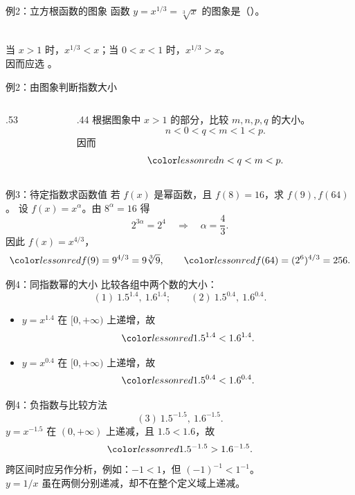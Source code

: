 \begin{frame}[t]{例2：立方根函数的图象}
 函数 $y=x^{1/3}=\sqrt[3]x$ 的图象是（\quad）。
 \par\rootchoices
 \pause
 \\
 当 $x>1$ 时，$x^{1/3}<x$；当 $0<x<1$ 时，$x^{1/3}>x$。\\
 因而应选 。
\end{frame}

\begin{frame}[t]{例2：由图象判断指数大小}
 \begin{columns}[T,onlytextwidth]
  \begin{column}{.53\textwidth}\centering\powerorder\end{column}
  \begin{column}{.44\textwidth}
   根据图象中 $x>1$ 的部分，比较 $m,n,p,q$ 的大小。
   \pause
   \[n<0<q<m<1<p.\]
   因而
   \[\ans{n<q<m<p}.\]
  \end{column}
 \end{columns}
\end{frame}

\begin{frame}[t]{例3：待定指数求函数值}
 若 $f(x)$ 是幂函数，且 $f(8)=16$，求 $f(9),f(64)$。
 \pause
 设 $f(x)=x^\alpha$。由 $8^\alpha=16$ 得
 \[2^{3\alpha}=2^4\quad\Longrightarrow\quad\alpha=\frac43.\]
 因此 $f(x)=x^{4/3}$，
 \[\ans{f(9)=9^{4/3}=9\sqrt[3]9},\qquad
   \ans{f(64)=(2^6)^{4/3}=256}.\]
\end{frame}

\begin{frame}[t]{例4：同指数幂的大小}
 比较各组中两个数的大小：
 \[(1)\ 1.5^{1.4},\ 1.6^{1.4};\qquad
   (2)\ 1.5^{0.4},\ 1.6^{0.4}.\]
 \pause
 \begin{itemize}
  \item $y=x^{1.4}$ 在 $[0,+\infty)$ 上递增，故
   \[\ans{1.5^{1.4}<1.6^{1.4}}.\]
  \item $y=x^{0.4}$ 在 $[0,+\infty)$ 上递增，故
   \[\ans{1.5^{0.4}<1.6^{0.4}}.\]
 \end{itemize}
\end{frame}

\begin{frame}[t]{例4：负指数与比较方法}
 \[(3)\ 1.5^{-1.5},\ 1.6^{-1.5}.\]
 \pause
 $y=x^{-1.5}$ 在 $(0,+\infty)$ 上递减，且 $1.5<1.6$，故
 \[\ans{1.5^{-1.5}>1.6^{-1.5}}.\]
 \gap
 \gap
 跨区间时应另作分析，例如：$-1<1$，但 $(-1)^{-1}<1^{-1}$。\\
 $y=1/x$ 虽在两侧分别递减，却不在整个定义域上递减。
\end{frame}
